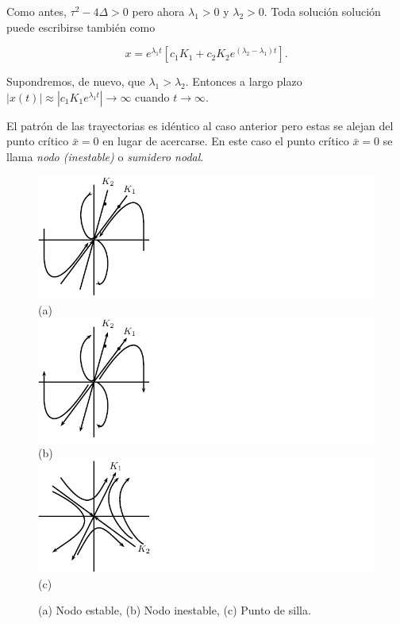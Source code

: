 Como antes, $\tau^2 - 4\Delta > 0$ pero ahora $\lambda_1 > 0$ y $\lambda_2 > 0$.
Toda solución solución puede escribirse también como

$$ x = e^{\lambda_1 t} [ c_1 K_1 + c_2K_2 e^{(\lambda_2 - \lambda_1)t} ].$$

Supondremos, de nuevo, que $\lambda_1 > \lambda_2$. Entonces a largo plazo $|x(t)| \approx |c_1 K_1 e^{\lambda_1 t}| \to \infty$ cuando $t \to \infty$.

El patrón de las trayectorias es idéntico al caso anterior pero estas se alejan del punto crítico $\bar{x} = 0$ en lugar de acercarse. En este caso el punto crítico $\bar{x} = 0$ se llama \emph{nodo (inestable)} o \emph{sumidero nodal}.

\begin{figure}[!ht] \centering
    \includegraphics[scale=1.0]{figures/nodoestable.pdf}\\(a)\\
    \includegraphics[scale=1.0]{figures/nodoinestable.pdf}\\(b)\\
    \includegraphics[scale=1.0]{figures/puntodesilla.pdf}\\(c)\\
    \caption{(a) Nodo estable, (b) Nodo inestable, (c) Punto de silla.}
	\label{fig:nodos}
\end{figure}

